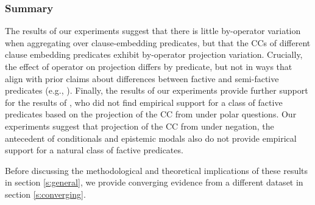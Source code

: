 \documentclass[a4paper,12pt,twoside]{article}
\newcommand{\poscite}[1]{\citeauthor{#1}'s \citeyear{#1}}
\begin{document}

   
	\subsubsection{Summary}

        The results of our experiments suggest that there is little by-operator variation when aggregating over clause-embedding predicates, but that the CCs of different clause embedding predicates exhibit by-operator projection variation. 
        Crucially, the effect of operator on projection differs by predicate, but not in ways that align with prior claims about differences between factive and semi-factive predicates (e.g., \citealt{karttunen_observations_1971}). Finally, the results of our experiments provide further support for the results of \citealt{degen_are_2022}, who did not find empirical support for a class of factive predicates based on the projection of the CC from under polar questions. Our experiments suggest that projection of the CC from under negation, the antecedent of conditionals and epistemic modals also do not provide empirical support for a natural class of factive predicates.

        Before discussing the methodological and theoretical implications of these results in section \ref{s:general}, we provide converging evidence from a different dataset in section \ref{s:converging}.
   
\end{document}
